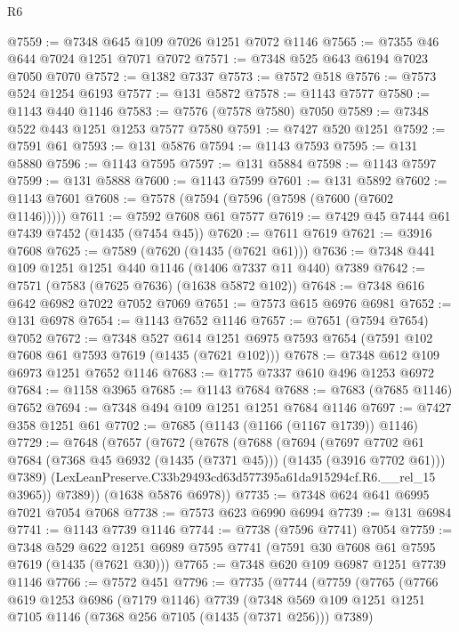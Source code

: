 \begin{lexlean}{R6}
\begin{coremodule}
@7559 := @7348 @645 @109 @7026 @1251 @7072 @1146
@7565 := @7355 @46 @644 @7024 @1251 @7071 @7072
@7571 := @7348 @525 @643 @6194 @7023 @7050 @7070
@7572 := @1382 @7337
@7573 := @7572 @518
@7576 := @7573 @524 @1254 @6193
@7577 := @131 @5872
@7578 := @1143 @7577
@7580 := @1143 @440 @1146
@7583 := @7576 (@7578 @7580) @7050
@7589 := @7348 @522 @443 @1251 @1253 @7577 @7580
@7591 := @7427 @520 @1251
@7592 := @7591 @61
@7593 := @131 @5876
@7594 := @1143 @7593
@7595 := @131 @5880
@7596 := @1143 @7595
@7597 := @131 @5884
@7598 := @1143 @7597
@7599 := @131 @5888
@7600 := @1143 @7599
@7601 := @131 @5892
@7602 := @1143 @7601
@7608 := @7578 (@7594 (@7596 (@7598 (@7600 (@7602 @1146)))))
@7611 := @7592 @7608 @61 @7577
@7619 := @7429 @45 @7444 @61 @7439 @7452 (@1435 (@7454 @45))
@7620 := @7611 @7619
@7621 := @3916 @7608
@7625 := @7589 (@7620 (@1435 (@7621 @61)))
@7636 := @7348 @441 @109 @1251 @1251 @440 @1146 (@1406 @7337 @11 @440) @7389
@7642 := @7571 (@7583 (@7625 @7636) (@1638 @5872 @102))
@7648 := @7348 @616 @642 @6982 @7022 @7052 @7069
@7651 := @7573 @615 @6976 @6981
@7652 := @131 @6978
@7654 := @1143 @7652 @1146
@7657 := @7651 (@7594 @7654) @7052
@7672 := @7348
    @527
    @614
    @1251
    @6975
    @7593
    @7654
    (@7591 @102 @7608 @61 @7593 @7619 (@1435 (@7621 @102)))
@7678 := @7348 @612 @109 @6973 @1251 @7652 @1146
@7683 := @1775 @7337 @610 @496 @1253 @6972
@7684 := @1158 @3965
@7685 := @1143 @7684
@7688 := @7683 (@7685 @1146) @7652
@7694 := @7348 @494 @109 @1251 @1251 @7684 @1146
@7697 := @7427 @358 @1251 @61
@7702 := @7685 (@1143 (@1166 (@1167 @1739)) @1146)
@7729 := @7648
    (@7657
      (@7672
        (@7678
          (@7688
            (@7694
              (@7697
                @7702
                @61
                @7684
                (@7368 @45 @6932 (@1435 (@7371 @45)))
                (@1435 (@3916 @7702 @61)))
              @7389)
            (LexLeanPreserve.C33b29493cd63d577395a61da915294cf.R6.__rel_15 @3965))
          @7389))
      (@1638 @5876 @6978))
@7735 := @7348 @624 @641 @6995 @7021 @7054 @7068
@7738 := @7573 @623 @6990 @6994
@7739 := @131 @6984
@7741 := @1143 @7739 @1146
@7744 := @7738 (@7596 @7741) @7054
@7759 := @7348
    @529
    @622
    @1251
    @6989
    @7595
    @7741
    (@7591 @30 @7608 @61 @7595 @7619 (@1435 (@7621 @30)))
@7765 := @7348 @620 @109 @6987 @1251 @7739 @1146
@7766 := @7572 @451
@7796 := @7735
    (@7744
      (@7759
        (@7765
          (@7766
            @619
            @1253
            @6986
            (@7179 @1146)
            @7739
            (@7348 @569 @109 @1251 @1251 @7105 @1146 (@7368 @256 @7105 (@1435 (@7371 @256))) @7389)

\end{coremodule}
\end{lexlean}
